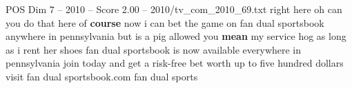 \begin{textsample}{POS Dim 7 – 2010 – Score 2.00 – 2010/tv\_com\_2010\_69.txt}  \label{ex:f7_pos_071}
right here oh can you do that here of \textbf{course} now i can bet the game on fan dual sportsbook anywhere in pennsylvania but is a pig allowed you \textbf{mean} my service hog as long as i rent her shoes fan dual sportsbook is now available everywhere in pennsylvania join today and get a risk-free bet worth up to five hundred dollars visit fan dual sportsbook.com fan dual sports

\end{textsample}
